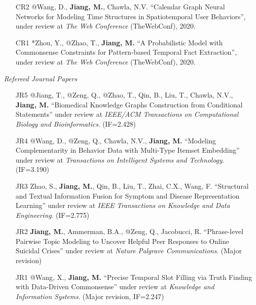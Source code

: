 \documentclass[10pt]{article}
\newenvironment{myindentpar}[1]%
{\begin{list}{}%
         {\setlength{\leftmargin}{#1}}%
         \item[]%
}
{\end{list}}
\newcounter{list}
\begin{document}
\begin{myindentpar}{0.00cm}
\begin{enumerate}[leftmargin=.5cm]
\item[CR2] @Wang, D., \textbf{Jiang, M.}, Chawla, N.V. ``Calendar Graph Neural Networks for Modeling Time Structures in Spatiotemporal User Behaviors'', under review at \textit{The Web Conference} (TheWebConf), 2020.

\item[CR1] *Zhou, Y., @Zhao, T., \textbf{Jiang, M.} ``A Probabilistic Model with Commonsense Constraints for Pattern-based Temporal Fact Extraction'', under review at \textit{The Web Conference} (TheWebConf), 2020.

\end{enumerate}

\hspace{-0.25cm}\emph{Refereed Journal Papers}

\begin{enumerate}[leftmargin=.5cm]

\item[JR5] @Jiang, T., @Zeng, Q., @Zhao, T., Qin, B., Liu, T., Chawla, N.V., \textbf{Jiang, M.} ``Biomedical Knowledge Graphs Construction from Conditional Statements'' under review at \textit{IEEE/ACM Transactions on Computational Biology and Bioinformatics}. (IF=2.428)
		
\item[JR4] @Wang, D., @Zeng, Q., Chawla, N.V., \textbf{Jiang, M.} ``Modeling Complementarity in Behavior Data with Multi-Type Itemset Embedding'' under review at \textit{Transactions on Intelligent Systems and Technology}. (IF=3.190)

\item[JR3] Zhao, S., \textbf{Jiang, M.}, Qin, B., Liu, T., Zhai, C.X., Wang, F. ``Structural and Textual Information Fusion for Symptom and Disease Representation Learning'' under review at \textit{IEEE Transactions on Knowledge and Data Engineering}. (IF=2.775)	
		
\item[JR2] \textbf{Jiang, M.}, Ammerman, B.A., @Zeng, Q., Jacobucci, R. ``Phrase-level Pairwise Topic Modeling to Uncover Helpful Peer Responses to Online Suicidal Crises'' under review at \textit{Nature Palgrave Communications}. (Major revision)	

\item[JR1] @Wang, X., \textbf{Jiang, M.} ``Precise Temporal Slot Filling via Truth Finding with Data-Driven Commonsense'' under review at \textit{Knowledge and Information Systems}. (Major revision, IF=2.247)
	
\end{enumerate}


	

\end{myindentpar}
\end{document}
